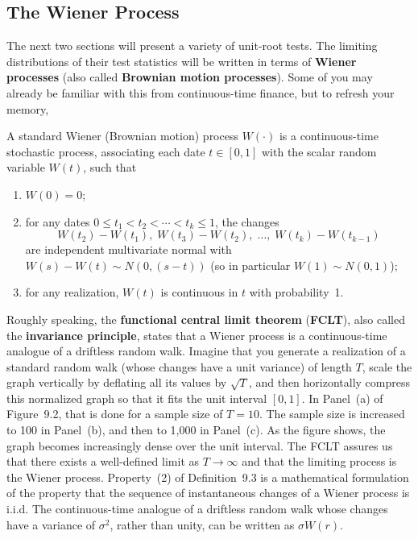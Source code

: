\subsection*{The Wiener Process}

The next two sections will present a variety of unit-root tests. The limiting distributions of their test statistics will be written in terms of \textbf{Wiener processes} (also
called \textbf{Brownian motion processes}). Some of you may already be familiar with
this from continuous-time finance, but to refresh your memory,

\begin{definition}
\label{def:9.3}
A standard Wiener (Brownian
motion) process $W(\cdot)$ is a continuous-time stochastic process, associating each
date $t \in [0, 1]$ with the scalar random variable $W(t)$, such that
\begin{enumerate}
\item $W(0) = 0$;
\item for any dates $0 \leq t_1 < t_2 < \cdots < t_k \leq 1$, the changes
\[
W(t_2) - W(t_1),\; W(t_3) - W(t_2),\; \ldots,\; W(t_k) - W(t_{k-1})
\]
are independent multivariate normal with $W(s) - W(t) \sim N(0, (s-t))$ (so in
particular $W(1) \sim N(0,1)$);
\item for any realization, $W(t)$ is continuous in $t$ with probability~1.
\end{enumerate}
\end{definition}

Roughly speaking, the \textbf{functional central limit theorem} (\textbf{FCLT}), also called the
\textbf{invariance principle}, states that a Wiener process is a continuous-time analogue
of a driftless random walk. Imagine that you generate a realization of a standard
random walk (whose changes have a unit variance) of length $T$, scale the graph
vertically by deflating all its values by $\sqrt{T}$, and then horizontally compress this
normalized graph so that it fits the unit interval $[0, 1]$. In Panel~(a) of Figure~9.2,
that is done for a sample size of $T = 10$. The sample size is increased to 100 in
Panel~(b), and then to 1,000 in Panel~(c). As the figure shows, the graph becomes
increasingly dense over the unit interval. The FCLT assures us that there exists a
well-defined limit as $T \to \infty$ and that the limiting process is the Wiener process.
Property~(2) of Definition~9.3 is a mathematical formulation of the property that the
sequence of instantaneous changes of a Wiener process is i.i.d. The continuous-time analogue of a driftless random walk whose changes have a variance of $\sigma^2$,
rather than unity, can be written as $\sigma W(r)$.


